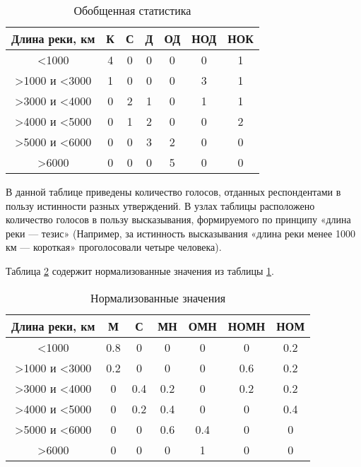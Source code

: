 \captionsetup{format=hang, justification=raggedright, 
	singlelinecheck=off}
\begin{table}[h]
	\begin{center}
		\caption{\label{tab:time1}Обобщенная статистика}
		\begin{tabular}{|c|c|c|c|c|c|c|}
		\hline
		Длина реки, км & К & С & Д & ОД & НОД & НОК \\
		\hline
		<1000 & 4 & 0 & 0 & 0 & 0 & 1  \\
		\hline
		>1000 и <3000 & 1 & 0 & 0 & 0 & 3 & 1 \\
		\hline
		>3000 и <4000 & 0 & 2 & 1 & 0 & 1 & 1 \\
		\hline
		>4000 и <5000 & 0 & 1 & 2 & 0 & 0 & 2  \\
		\hline
		>5000 и <6000 & 0 & 0 & 3 & 2 & 0 & 0  \\
		\hline
		>6000 & 0 & 0 & 0 & 5 & 0 & 0  \\
		\hline
		\end{tabular}
	\end{center}
\end{table}

В данной таблице приведены количество голосов, отданных респондентами в пользу истинности разных утверждений. В узлах таблицы расположено количество голосов в пользу высказывания, формируемого по принципу  «длина реки --- тезис» (Например, за истинность высказывания «длина реки менее 1000 км --- короткая» проголосовали четыре человека).

Таблица \ref{tab:time2} содержит нормализованные значения из таблицы \ref{tab:time1}.

\captionsetup{format=hang, justification=raggedright, 
	singlelinecheck=off}
\begin{table}[h]
	\begin{center}
		\caption{\label{tab:time2}Нормализованные значения}
		\begin{tabular}{|c|c|c|c|c|c|c|}
		\hline
		Длина реки, км& М & С & МН & ОМН & НОМН & НОМ \\
		\hline
		<1000 & 0.8 & 0 & 0 & 0 & 0 & 0.2  \\
		\hline
		>1000 и <3000 & 0.2 & 0 & 0 & 0 & 0.6 & 0.2 \\
		\hline
		>3000 и <4000 & 0 & 0.4 & 0.2 & 0 & 0.2 & 0.2 \\
		\hline
		>4000 и <5000 & 0 & 0.2 & 0.4 & 0 & 0 & 0.4  \\
		\hline
		>5000 и <6000 & 0 & 0 & 0.6 & 0.4 & 0 & 0  \\
		\hline
		>6000 & 0 & 0 & 0 & 1 & 0 & 0  \\
		\hline
		\end{tabular}
	\end{center}
\end{table}


